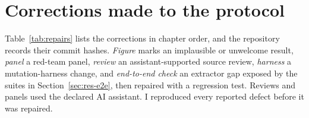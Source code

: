 \thesisappendix

\section{Corrections made to the protocol}
\label{app:corrections}

Table~\ref{tab:repairs} lists the corrections in chapter order, and the repository records their commit hashes.
\emph{Figure} marks an implausible or unwelcome result, \emph{panel} a red-team panel,
\emph{review} an assistant-supported source review, \emph{harness} a mutation-harness change, and
\emph{end-to-end check} an extractor gap exposed by the suites in Section~\ref{sec:res-e2e}, then repaired with a regression test.
Reviews and panels used the declared AI assistant. I reproduced every reported defect before it was repaired.

